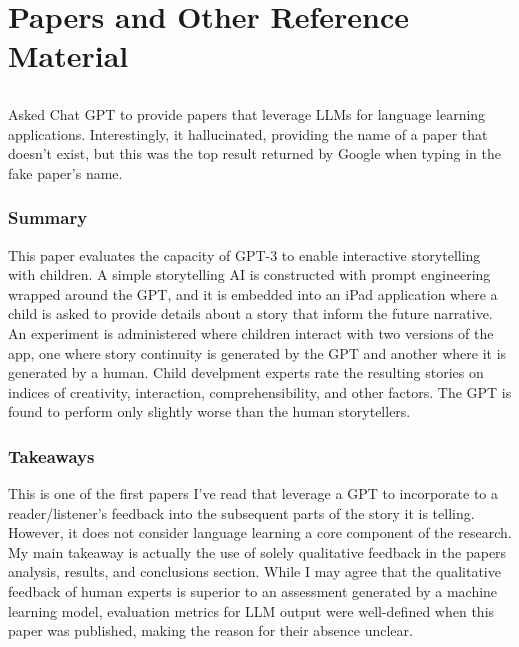 \documentclass[
	letterpaper, %
]{jdf}
\begin{document}
\section{Papers and Other Reference Material}

\subsection{}

Asked Chat GPT to provide papers that leverage LLMs for language learning applications. Interestingly, it hallucinated, providing the name of a paper that doesn't exist, but this was the top result returned by Google when typing in the fake paper's name.

\subsubsection{Summary}
This paper evaluates the capacity of GPT-3 to enable interactive storytelling with children. A simple storytelling AI is constructed with prompt engineering wrapped around the GPT, and it is embedded into an iPad application where a child is asked to provide details about a story that inform the future narrative. An experiment is administered where children interact with two versions of the app, one where story continuity is generated by the GPT and another where it is generated by a human. Child develpment experts rate the resulting stories on indices of creativity, interaction, comprehensibility, and other factors. The GPT is found to perform only slightly worse than the human storytellers.

\subsubsection{Takeaways}
This is one of the first papers I've read that leverage a GPT to incorporate to a reader/listener's feedback into the subsequent parts of the story it is telling. However, it does not consider language learning a core component of the research. My main takeaway is actually the use of solely qualitative feedback in the papers analysis, results, and conclusions section. While I may agree that the qualitative feedback of human experts is superior to an assessment generated by a machine learning model, evaluation metrics for LLM output were well-defined when this paper was published, making the reason for their absence unclear.
\end{document}
